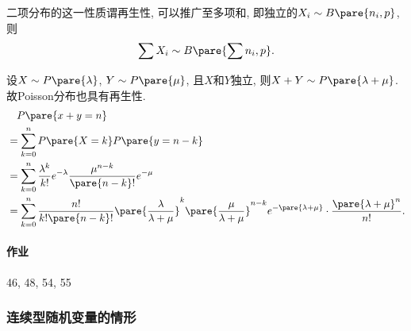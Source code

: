 \documentclass[../Statistics.tex]{subfiles}
\begin{document}
二项分布的这一性质谓再生性, 可以推广至多项和, 即独立的$X_i \sim B\pare{n_i,p}$, 则
\[ \sum X_i \sim B\pare{\sum n_i, p}. \]
\begin{sample}
    \begin{ex}
        设$X\sim P\pare{\lambda}$, $Y\sim P\pare{\mu}$, 且$X$和$Y$独立, 则$X+Y \sim P\pare{\lambda + \mu}$. 故Poisson分布也具有再生性.
        \begin{align*}
            &\phantom{=} \, P\pare{x+y = n} \\
            &= \sum_{k=0}^n P\pare{X=k} P\pare{y=n-k} \\
            &= \sum_{k=0}^n \frac{\lambda^k}{k!}e^{-\lambda} \frac{\mu^{n-k}}{\pare{n-k}!}e^{-\mu} \\
            &= \sum_{k=0}^n \frac{n!}{k!\pare{n-k}!} \pare{\frac{\lambda}{\lambda + \mu}}^k \pare{\frac{\mu}{\lambda+\mu}}^{n-k} e^{-\pare{\lambda+\mu}} \cdot \frac{\pare{\lambda+\mu}^n}{n!}.
        \end{align*}
    \end{ex}
\end{sample}
\paragraph{作业} %
\label{par:作业}

46, 48, 54, 55


\subsubsection{连续型随机变量的情形} %
\label{ssub:连续型随机变量的情形}
\end{document}

